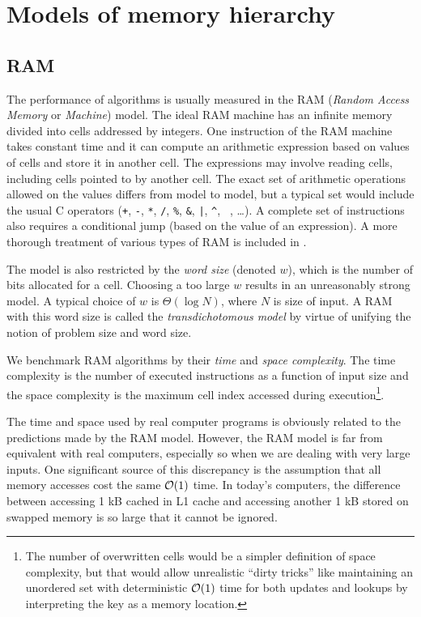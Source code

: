 \chapter{Models of memory hierarchy}
\label{chapter:models}
\section{RAM}

The performance of algorithms is usually measured in the RAM
(\emph{Random Access Memory} or \emph{Machine}) model.
The ideal RAM machine has an infinite memory divided into cells addressed
by integers.
One instruction of the RAM machine takes constant time and it
can compute an arithmetic expression based on values of cells and store it
in another cell. The expressions may involve reading cells, including cells
pointed to by another cell. The exact set of arithmetic operations allowed
on the values differs from model to model, but a typical set would include
the usual C operators (\texttt{+}, \texttt{-}, \texttt{*}, \texttt{/},
\texttt{\%}, \texttt{\&}, \texttt{|}, \texttt{\^}, \texttt{~}, \dots).
A complete set of instructions also requires a conditional jump (based on
the value of an expression).
A more thorough treatment of various types of RAM is included
in \cite{saga-of-msts}.

The model is also restricted by the \textit{word size} (denoted $w$),
which is the number of bits allocated for a cell. Choosing a too large $w$
results in an unreasonably strong model. A typical choice of $w$ is
$\Theta(\log N)$, where $N$ is size of input.
A RAM with this word size is called the \textit{transdichotomous model}
by virtue of unifying the notion of problem size and word size.

We benchmark RAM algorithms by their \emph{time} and \emph{space complexity}.
The time complexity is the number of executed instructions as a function of
input size and the space complexity is the maximum cell index accessed during
execution\footnote{
	The number of overwritten cells would be a simpler definition
	of space complexity, but that would allow unrealistic ``dirty tricks''
	like maintaining an unordered set with deterministic $\mathcal{O}(1)$ time
	for both updates and lookups by interpreting the key as a memory
	location.
}.

The time and space used by real computer programs is obviously related
to the predictions made by the RAM model. However, the RAM model is far
from equivalent with real computers, especially so when we are dealing with
very large inputs. One significant source of this discrepancy is the assumption
that all memory accesses cost the same $\mathcal{O}(1)$ time. In today's computers,
the difference between accessing 1 kB cached in L1 cache and accessing
another 1 kB stored on swapped memory is so large that it cannot be ignored.

